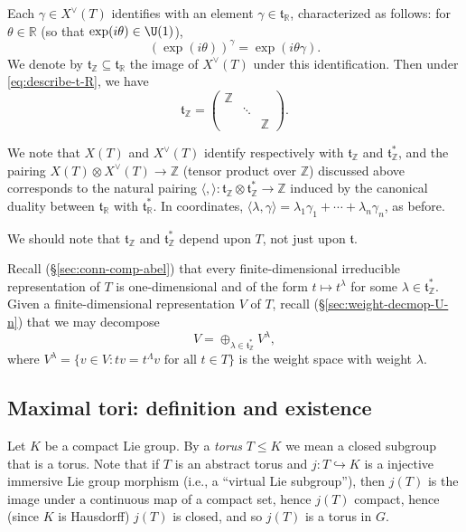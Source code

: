 \documentclass[reqno]{amsart} 
\begin{document}
Each $\gamma \in X^\vee(T)$ identifies with an element $\gamma \in \mathfrak{t}_{\mathbb{R}}$, characterized as follows: for $\theta \in \mathbb{R}$ (so that $\exp(i \theta) \in \U(1)$),
\begin{equation*}
  (\exp(i \theta))^{\gamma} = \exp(i \theta \gamma).
\end{equation*}
We denote by $\mathfrak{t}_{\mathbb{Z}} \subseteq \mathfrak{t}_{\mathbb{R}}$ the image of $X^\vee(T)$ under this identification.  Then under \eqref{eq:describe-t-R}, we have
\begin{equation}\label{eq:describe-t-Z}
  \mathfrak{t}_{\mathbb{Z}} =
  \begin{pmatrix}
    \mathbb{Z}  &  &  \\
    & \ddots  &  \\
    & & \mathbb{Z}
  \end{pmatrix}
.
\end{equation}

We note that $X(T)$ and $X^\vee(T)$ identify respectively with $\mathfrak{t}_{\mathbb{Z}}$ and $\mathfrak{t}_{\mathbb{Z}}^*$, and the pairing $X(T) \otimes X^\vee(T) \rightarrow \mathbb{Z}$ (tensor product over $\mathbb{Z}$) discussed above corresponds to the natural pairing $\langle , \rangle : \mathfrak{t}_{\mathbb{Z}} \otimes \mathfrak{t}_{\mathbb{Z}}^* \rightarrow \mathbb{Z}$ induced by the canonical duality between $\mathfrak{t}_{\mathbb{R}}$ with $\mathfrak{t}_{\mathbb{R}}^*$.  In coordinates, $\langle \lambda, \gamma \rangle = \lambda_1 \gamma_1 + \dotsb + \lambda_n \gamma_n$, as before.

We should note that $\mathfrak{t}_{\mathbb{Z}}$ and $\mathfrak{t}_{\mathbb{Z}}^*$ depend upon $T$, not just upon $\mathfrak{t}$.

Recall (\S\ref{sec:conn-comp-abel}) that every finite-dimensional irreducible representation of $T$ is one-dimensional and of the form $t \mapsto t^{\lambda}$ for some $\lambda \in \mathfrak{t}_{\mathbb{Z}}^*$.  Given a finite-dimensional representation $V$ of $T$, recall (\S\ref{sec:weight-decmop-U-n}) that we may decompose
\begin{equation*}
  V = \oplus_{\lambda \in \mathfrak{t}_{\mathbb{Z}}^*} V^{\lambda},
\end{equation*}
where $V^{\lambda} = \{v \in V : t v = t^{\Lambda} v \text{ for all } t \in T\}$ is the weight space with weight $\lambda$.

\subsection{Maximal tori: definition and existence}\label{sec:maxim-tori:-defin}
Let $K$ be a compact Lie group.  By a \emph{torus} $T \leq K$ we mean a closed subgroup that is a torus.  Note that if $T$ is an abstract torus and $j : T \hookrightarrow K$ is a injective immersive Lie group morphism (i.e., a ``virtual Lie subgroup''), then $j(T)$ is the image under a continuous map of a compact set, hence $j(T)$ compact, hence (since $K$ is Hausdorff) $j(T)$ is closed, and so $j(T)$ is a torus in $G$.
\end{document}
